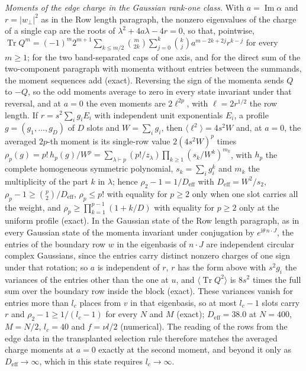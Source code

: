 \emph{Moments of the edge charge in the Gaussian rank-one class.} With \(a=\operatorname{Im}\alpha\) and \(r=|w_\perp|^{2}\) as in the Row length paragraph, the nonzero eigenvalues of the charge of a single cap are the roots of \(\lambda^{2}+4a\lambda-4r=0\), so that, pointwise, \(\operatorname{Tr}Q^{m}=(-1)^{m}2^{m+1}\sum_{k\le m/2}\binom{m}{2k}\sum_{j=0}^{k}\binom{k}{j}a^{m-2k+2j}r^{k-j}\) for every \(m\ge1\); for the two band-separated caps of one axis, and for the direct sum of the two-component paragraph with momenta without entries between the summands, the moment sequences add (exact). Reversing the sign of the momenta sends \(Q\) to \(-Q\), so the odd moments average to zero in every state invariant under that reversal, and at \(a=0\) the even moments are \(2\ell^{2p}\), with \(\ell=2r^{1/2}\) the row length. If \(r=s^{2}\sum_{i}g_{i}E_{i}\) with independent unit exponentials \(E_{i}\), a profile \(g=(g_{1},\dots,g_{D})\) of \(D\) slots and \(W=\sum_{i}g_{i}\), then \(\langle\ell^{2}\rangle=4s^{2}W\) and, at \(a=0\), the averaged \(2p\)-th moment is its single-row value \(2(4s^{2}W)^{p}\) times \(\rho_{p}(g)=p!\,h_{p}(g)/W^{p}=\sum_{\lambda\vdash p}(p!/z_{\lambda})\prod_{k\ge1}(s_{k}/W^{k})^{m_{k}}\), with \(h_{p}\) the complete homogeneous symmetric polynomial, \(s_{k}=\sum_{i}g_{i}^{k}\) and \(m_{k}\) the multiplicity of the part \(k\) in \(\lambda\); hence \(\rho_{2}-1=1/D_{\mathrm{eff}}\) with \(D_{\mathrm{eff}}=W^{2}/s_{2}\), \(\rho_{p}-1\ge\binom{p}{2}/D_{\mathrm{eff}}\), \(\rho_{p}\le p!\) with equality for \(p\ge2\) only when one slot carries all the weight, and \(\rho_{p}\ge\prod_{k=1}^{p-1}(1+k/D)\) with equality for \(p\ge2\) only at the uniform profile (exact). In the Gaussian state of the Row length paragraph, as in every Gaussian state of the momenta invariant under conjugation by \(e^{\mathrm i\theta\,n\cdot J}\), the entries of the boundary row \(w\) in the eigenbasis of \(n\cdot J\) are independent circular complex Gaussians, since the entries carry distinct nonzero charges of one sign under that rotation; so \(a\) is independent of \(r\), \(r\) has the form above with \(s^{2}g_{i}\) the variances of the entries other than the one at \(u\), and \(\langle\operatorname{Tr}Q^{2}\rangle\) is \(8s^{2}\) times the full sum over the boundary row inside the block (exact). These variances vanish for entries more than \(l_c\) places from \(v\) in that eigenbasis, so at most \(l_c-1\) slots carry \(r\) and \(\rho_{2}-1\ge1/(l_c-1)\) for every \(N\) and \(M\) (exact); \(D_{\mathrm{eff}}=38.0\) at \(N=400\), \(M=N/2\), \(l_c=40\) and \(f=\nu l/2\) (numerical). The reading of the rows from the edge data in the transplanted selection rule therefore matches the averaged charge moments at \(a=0\) exactly at the second moment, and beyond it only as \(D_{\mathrm{eff}}\to\infty\), which in this state requires \(l_c\to\infty\).


